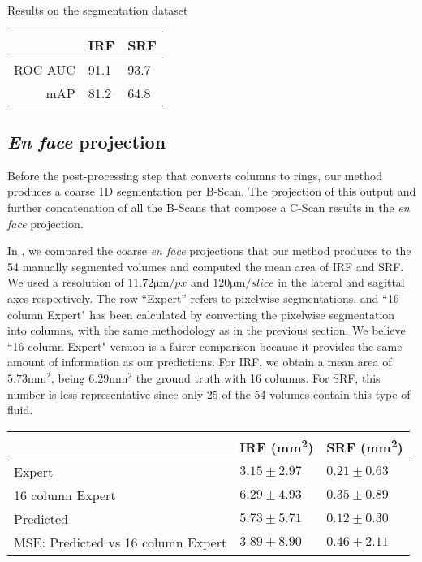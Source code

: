 \begin{margintable}[]\small
\caption{Results on the segmentation dataset}
\label{tab:segmentation_results}
\begin{tabular}{@{}rll@{}}
\toprule
 & \textbf{IRF} & \textbf{SRF} \\ \midrule
ROC AUC & 91.1 & 93.7 \\
mAP & 81.2 & 64.8 \\ \bottomrule
\end{tabular}
\end{margintable}

\subsection{\textit{En face} projection}

Before the post-processing step that converts columns to rings, our method produces a coarse 1D segmentation per B-Scan. The projection of this output and further concatenation of all the B-Scans that compose a C-Scan results in the \textit{en face} projection.

In , we compared the coarse \textit{en face} projections that our method produces to the 54 manually segmented volumes and computed the mean area of IRF and SRF. We used a resolution of $11.72 \si{\micro\meter\per px}$ and $120 \si{\micro\meter\per slice}$ in the lateral and sagittal axes respectively. The row “Expert” refers to pixelwise segmentations, and ``16 column Expert" has been calculated by converting the pixelwise segmentation into columns, with the same methodology as in the previous section. We believe ``16 column Expert" version is a fairer comparison because it provides the same amount of information as our predictions. For IRF, we obtain a mean area of $5.73 \si{\milli\meter^2}$, being $6.29 \si{\milli\meter^2}$ the ground truth with 16 columns. For SRF, this number is less representative since only 25 of the 54 volumes contain this type of fluid.

\begin{table}[]
\centering
\begin{tabular}{@{}lll@{}}
\toprule
 & \textbf{IRF (\si{\milli\meter^2})} & \textbf{SRF (\si{\milli\meter^2})} \\ \midrule
Expert & $3.15\pm2.97$ & $0.21\pm0.63$ \\
16 column Expert & $6.29\pm4.93$ & $0.35\pm0.89$ \\
Predicted & $5.73\pm5.71$ & $0.12\pm0.30$ \\
MSE: Predicted vs 16 column Expert & $3.89\pm8.90$ & $0.46\pm2.11$ \\ \bottomrule
\end{tabular}
\end{table}

